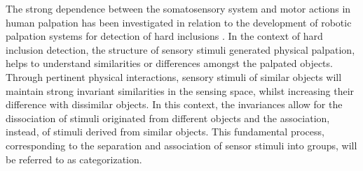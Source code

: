 \color{black}
The strong dependence between the somatosensory system and motor actions in human palpation has been investigated in relation to the development of robotic palpation systems for detection of hard inclusions \cite{Liza2014behavioral,sornkarn2016efficacy, yen2003palpation, konstantinova2017palpation, herzig2018variable}. 
In the context of hard inclusion detection, the structure of sensory stimuli generated physical palpation, helps to understand similarities or differences amongst the palpated objects. Through pertinent physical interactions, sensory stimuli of similar objects will maintain strong invariant similarities in the sensing space, whilst increasing their difference with dissimilar objects. In this context, the invariances allow for the dissociation of stimuli originated from different objects and the association, instead, of stimuli derived from similar objects. This fundamental process, corresponding to the separation and association of sensor stimuli into groups, will be referred to as categorization.



